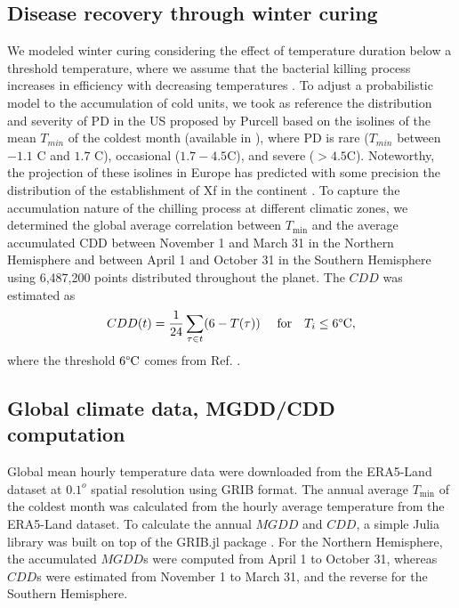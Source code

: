 \subsection{Disease recovery through winter curing}

We modeled winter curing considering the effect of temperature duration below
a threshold temperature, where we assume that the bacterial killing process
increases in efficiency with decreasing temperatures \cite{Lieth2011}. To
adjust a probabilistic model to the accumulation of cold units, we took as
reference the distribution and severity of PD in the US proposed by Purcell
based on the isolines of the mean $T_{ min}$ of the coldest month (available in
\cite{Anas2008}), where PD is rare ($T_{ min}$ between $-1.1$ \textdegree C and
$1.7$ \textdegree C), occasional ($1.7-4.5$\textdegree C), and severe ($>
    4.5$\textdegree C). Noteworthy, the projection of these isolines in Europe
has predicted with some precision the distribution of the establishment of Xf
in the continent \cite{Bragard2019}. To capture the accumulation nature of the
chilling process at different climatic zones, we determined the global average
correlation between $T_{\textrm{min}}$ and the average accumulated CDD between
November 1 and March 31 in the Northern Hemisphere and between April 1 and
October 31 in the Southern Hemisphere using 6,487,200 points distributed
throughout the planet. The $CDD$ was estimated as
\begin{equation}\label{eq:CDDdef}
    CDD(t)= \frac{1}{24}\sum_{\tau \in t} (6-T(\tau)) \ \quad \textrm{for}
    \quad T_i\le 6\textrm{\textdegree C} ,
\end{equation}
where the threshold $6 \textrm{\textdegree C}$ comes from Ref.
\cite{Lieth2011}.

\subsection{Global climate data, MGDD/CDD computation}

Global mean hourly temperature data were downloaded from the ERA5-Land
dataset \cite{ERA5_dataset} at $0.1^o$ spatial resolution using GRIB format.
The annual average $T_{\textrm{min}}$ of the coldest month was calculated from
the hourly average temperature from the ERA5-Land dataset. To calculate the
annual $MGDD$ and $CDD$, a simple Julia \cite{julia} library was built on top
of the GRIB.jl package \cite{GRIB}. For the Northern Hemisphere, the
accumulated $MGDD$s were computed from April 1 to October 31, whereas $CDD$s
were estimated from November 1 to March 31, and the reverse for the Southern
Hemisphere.

